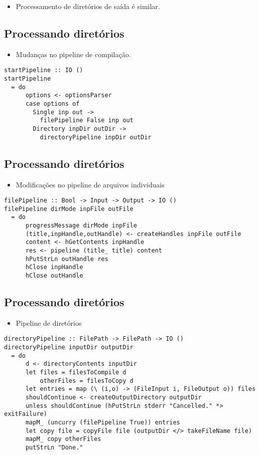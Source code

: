 \documentclass[11pt]{article}
\begin{document}
\begin{itemize}
\item Processamento de diretórios de saída é similar.
\end{itemize}
\subsection*{Processando diretórios}
\label{sec:org894ad54}

\begin{itemize}
\item Mudanças no pipeline de compilação.
\end{itemize}

\begin{verbatim}
startPipeline :: IO ()
startPipeline
  = do
      options <- optionsParser
      case options of
        Single inp out ->
          filePipeline False inp out
        Directory inpDir outDir ->
          directoryPipeline inpDir outDir
\end{verbatim}
\subsection*{Processando diretórios}
\label{sec:orge85774f}

\begin{itemize}
\item Modificações no pipeline de arquivos individuais
\end{itemize}

\begin{verbatim}
filePipeline :: Bool -> Input -> Output -> IO ()
filePipeline dirMode inpFile outFile 
  = do
      progressMessage dirMode inpFile
      (title,inpHandle,outHandle) <- createHandles inpFile outFile
      content <- hGetContents inpHandle
      res <- pipeline (title_ title) content
      hPutStrLn outHandle res
      hClose inpHandle
      hClose outHandle
\end{verbatim}
\subsection*{Processando diretórios}
\label{sec:org9256d4b}

\begin{itemize}
\item Pipeline de diretórios
\end{itemize}

\begin{verbatim}
directoryPipeline :: FilePath -> FilePath -> IO ()
directoryPipeline inputDir outputDir
  = do
      d <- directoryContents inputDir
      let files = filesToCompile d
          otherFiles = filesToCopy d
      let entries = map (\ (i,o) -> (FileInput i, FileOutput o)) files
      shouldContinue <- createOutputDirectory outputDir
      unless shouldContinue (hPutStrLn stderr "Cancelled." *> exitFailure)
      mapM_ (uncurry (filePipeline True)) entries
      let copy file = copyFile file (outputDir </> takeFileName file)
      mapM_ copy otherFiles
      putStrLn "Done."
\end{verbatim}
\end{document}
